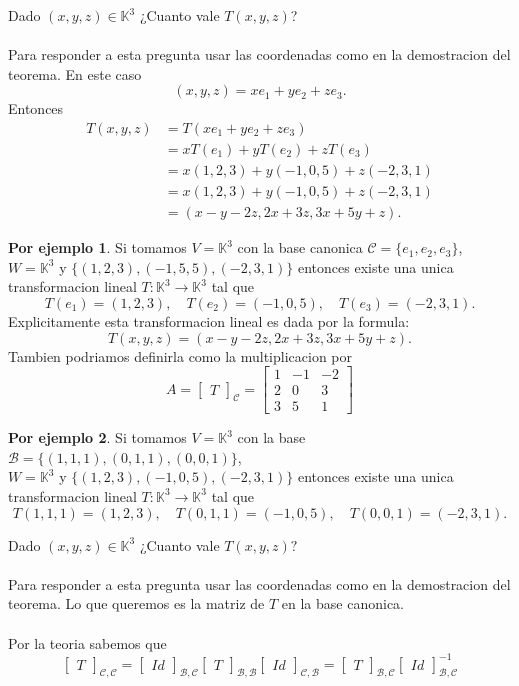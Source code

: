 \documentclass{article}
\theoremstyle{definition}
\theoremstyle{definition}
\newtheorem*{ej}{Por ejemplo}
\theoremstyle{remark}
\begin{document}
Dado $(x,y,z) \in \mathbb{K}^3$ ¿Cuanto vale $T(x,y,z)$? \\\\ Para responder a esta pregunta usar las coordenadas como en la demostracion del teorema. En este caso \[
  (x,y,z)=xe_1 + ye_2 + ze_3.
\]
Entonces \[
  \begin{aligned}
    T(x,y,z) &= T(xe_1+ye_2+ze_3) \\
             &= xT(e_1) +yT(e_2)+zT(e_3) \\
             &= x(1,2,3)+y(-1,0,5)+z(-2,3,1) \\
             &= x(1,2,3) + y(-1,0,5)+z(-2,3,1) \\
             &= (x-y-2z,2x+3z,3x+5y+z).
  \end{aligned}
\]
\begin{ej}
  Si tomamos $V = \mathbb{K}^3$ con la base canonica $\mathcal{C}= \{e_1, e_2, e_3\}$, \\ $W =\mathbb{K}^3$ y $\{(1,2,3),(-1,5,5),(-2,3,1)\}$ entonces existe una unica transformacion lineal $T : \mathbb{K}^3 \to \mathbb{K}^3$ tal que \[
T(e_1)=(1,2,3), \quad T(e_2)=(-1,0,5), \quad T(e_3) = (-2,3,1).
  \]
  Explicitamente esta transformacion lineal es dada por la formula: \[
T(x,y,z)=(x-y-2z,2x+3z,3x+5y+z).
  \]
  Tambien podriamos definirla como la multiplicacion por \[
    A=\begin{bmatrix}T\end{bmatrix}_{\mathcal{C}}=\begin{bmatrix}1 & -1 & -2 \\ 2 & 0 & 3 \\ 3 & 5 & 1 \end{bmatrix}
  \]
\end{ej}
\begin{ej}
  Si tomamos $V = \mathbb{K}^3$ con la base $\mathcal{B}=\{(1,1,1),(0,1,1),(0,0,1)\}$, \\$W= \mathbb{K}^3$ y $\{(1,2,3) ,(-1,0,5),(-2,3,1)\}$ entonces existe una unica transformacion lineal $T : \mathbb{K}^3 \to \mathbb{K}^3$ tal que \[
T(1,1,1)=(1,2,3), \quad T(0,1,1)=(-1,0,5), \quad T(0,0,1)=(-2,3,1).
  \]
\end{ej}
Dado $(x,y,z) \in \mathbb{K}^3$ ¿Cuanto vale $T(x,y,z)?$ \\\\ Para responder a esta pregunta usar las coordenadas como en la demostracion del teorema. Lo que queremos es la matriz de $T$ en la base canonica. \\\\ Por la teoria sabemos que \[
  \begin{bmatrix}T\end{bmatrix}_{\mathcal{C,C}}=\begin{bmatrix}Id\end{bmatrix}_{\mathcal{B,C}} \begin{bmatrix}T\end{bmatrix}_{\mathcal{B,B}} \begin{bmatrix}Id\end{bmatrix}_{\mathcal{C,B}} =\begin{bmatrix}T\end{bmatrix}_{\mathcal{B,C}}\begin{bmatrix}Id\end{bmatrix}_{\mathcal{B,C}}^{-1}
\]
\end{document}
